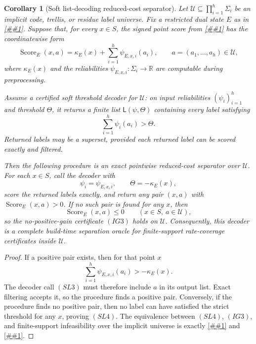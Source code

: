 \documentclass[10pt]{article}
\newcommand{\cref}[1]{\ref{##1}}
\newtheorem{corollary}[theorem]{Corollary}
\theoremstyle{definition}
\begin{document}
\begin{corollary}[Soft list-decoding reduced-cost separator]
   \label{cor:soft-list-decoding-reduced-cost-separator}
   Let \(\mathcal U\subseteq\prod_{i=1}^h\Sigma_i\) be an implicit code,
   trellis, or residue label universe.  Fix a restricted dual state \(E\) as in
   \cref{lem:implicit-reduced-gain-separation}.  Suppose that, for every
   \(x\in S\), the signed point score from
   \cref{cor:pointwise-reduced-cost-separation} has the coordinatewise form
   \[
      \operatorname{Score}_E(x,a)
      =
      \kappa_E(x)+\sum_{i=1}^h\psi_{E,x,i}(a_i),
      \qquad a=(a_1,\ldots,a_h)\in\mathcal U,
      \tag{SL1}
   \]
   where \(\kappa_E(x)\) and the reliabilities
   \(\psi_{E,x,i}:\Sigma_i\to\mathbb R\) are computable during
   preprocessing.

   Assume a certified soft threshold decoder for \(\mathcal U\): on input
   reliabilities \((\psi_i)_{i=1}^h\) and threshold \(\Theta\), it returns a
   finite list \(\mathsf L(\psi,\Theta)\) containing every label satisfying
   \[
      \sum_{i=1}^h\psi_i(a_i)>\Theta.
      \tag{SL2}
   \]
   Returned labels may be a superset, provided each returned label can be scored
   exactly and filtered.

   Then the following procedure is an exact pointwise reduced-cost separator
   over \(\mathcal U\).  For each \(x\in S\), call the decoder with
   \[
      \psi_i=\psi_{E,x,i},
      \qquad
      \Theta=-\kappa_E(x),
      \tag{SL3}
   \]
   score the returned labels exactly, and return any pair \((x,a)\) with
   \(\operatorname{Score}_E(x,a)>0\).  If no such pair is found for any
   \(x\), then
   \[
      \operatorname{Score}_E(x,a)\le0
      \qquad(x\in S,\ a\in\mathcal U),
      \tag{SL4}
   \]
   so the no-positive-gain certificate \((IG3)\) holds on \(\mathcal U\).
   Consequently, this decoder is a complete build-time separation oracle for
   finite-support rate-coverage certificates inside \(\mathcal U\).
\end{corollary}

\begin{proof}
   If a positive pair exists, then for that point \(x\)
   \[
      \sum_{i=1}^h\psi_{E,x,i}(a_i)>-\kappa_E(x).
   \]
   The decoder call \((SL3)\) must therefore include \(a\) in its output list.
   Exact filtering accepts it, so the procedure finds a positive pair.
   Conversely, if the procedure finds no positive pair, then no label can have
   satisfied the strict threshold for any \(x\), proving \((SL4)\).  The
   equivalence between \((SL4)\), \((IG3)\), and finite-support infeasibility
   over the implicit universe is exactly
   \cref{cor:pointwise-reduced-cost-separation} and
   \cref{lem:implicit-reduced-gain-separation}.
\end{proof}
\end{document}
